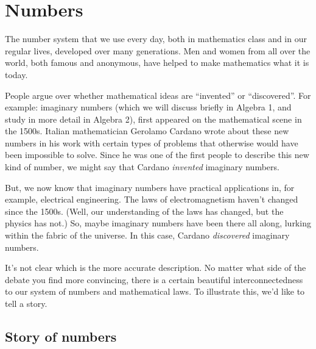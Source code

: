 \chapter{Numbers}
\label{ch:numbers}


The number system that we use every day, both in mathematics class and in our regular lives, developed over many generations. Men and women from all over the world, both famous and anonymous, have helped to make mathematics what it is today.

People argue over whether mathematical ideas are ``invented'' or ``discovered''. For example: \glspl{imaginary number} (which we will discuss briefly in Algebra 1, and study in more detail in Algebra 2), first appeared on the mathematical scene in the 1500s. Italian mathematician Gerolamo Cardano wrote about these new numbers in his work with certain types of problems that otherwise would have been impossible to solve. Since he was one of the first people to describe this new kind of number, we might say that Cardano \textit{invented} imaginary numbers.

But, we now know that imaginary numbers have practical applications in, for example, electrical engineering. The laws of electromagnetism haven't changed since the 1500s. (Well, our understanding of the laws has changed, but the physics has not.) So, maybe imaginary numbers have been there all along, lurking within the fabric of the universe. In this case, Cardano \textit{discovered} imaginary numbers.

It's not clear which is the more accurate description. No matter what side of the debate you find more convincing, there is a certain beautiful interconnectedness to our system of numbers and mathematical laws. To illustrate this, we'd like to tell a story.

\section{Story of numbers}
\label{sec:storyofnumbers}

\newenvironment{story}
{\begin{slshape}}
{\end{slshape}}

